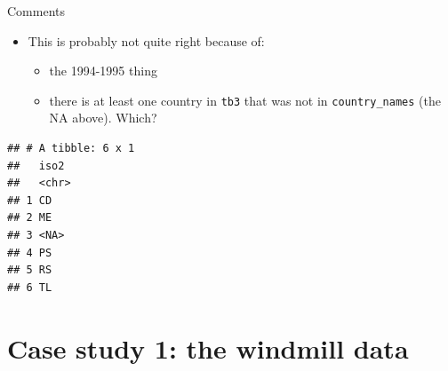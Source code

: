 \documentclass[ignorenonframetext,]{beamer}
\newenvironment{Shaded}{\begin{snugshade}}{\end{snugshade}}
\newcommand{\DataTypeTok}[1]{\textcolor[rgb]{0.13,0.29,0.53}{#1}}
\newcommand{\KeywordTok}[1]{\textcolor[rgb]{0.13,0.29,0.53}{\textbf{#1}}}
\newcommand{\NormalTok}[1]{#1}
\newcommand{\OperatorTok}[1]{\textcolor[rgb]{0.81,0.36,0.00}{\textbf{#1}}}
\newcommand{\StringTok}[1]{\textcolor[rgb]{0.31,0.60,0.02}{#1}}
\providecommand{\tightlist}{%
  \setlength{\itemsep}{0pt}\setlength{\parskip}{0pt}}
\begin{document}
\begin{frame}[fragile]{Comments}
\protect\hypertarget{comments-11}{}

\begin{itemize}
\tightlist
\item
  This is probably not quite right because of:

  \begin{itemize}
  \tightlist
  \item
    the 1994-1995 thing
  \item
    there is at least one country in \texttt{tb3} that was not in
    \texttt{country\_names} (the NA above). Which?
  \end{itemize}
\end{itemize}

\footnotesize

\begin{Shaded}
\end{Shaded}

\begin{verbatim}
## # A tibble: 6 x 1
##   iso2 
##   <chr>
## 1 CD   
## 2 ME   
## 3 <NA> 
## 4 PS   
## 5 RS   
## 6 TL
\end{verbatim}

\normalsize

\end{frame}

\hypertarget{case-study-1-the-windmill-data}{%
\section{Case study 1: the windmill
data}\label{case-study-1-the-windmill-data}}
\end{document}
